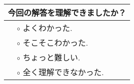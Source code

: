 \documentclass{jreport}
\begin{document}
\noindent
\begin{tabular}{|p{3cm}p{5cm}p{2cm}|}
\hline
        \multicolumn{3}{|c|}{今回の解答を理解できましたか？}\\
        \hline
                 &$\circ$ よくわかった.&\\
                &$\circ$ そこそこわかった.&\\
                 &$\circ$ ちょっと難しい.&\\
                &$\circ$ 全く理解できなかった.&\\
                        \hline
\end{tabular}\\
\end{document}
